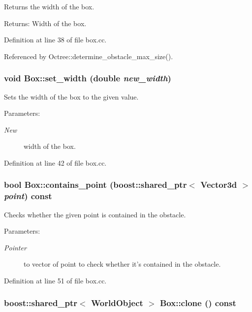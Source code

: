 Returns the width of the box. \begin{Desc}
\item[Returns:]Width of the box. \end{Desc}


Definition at line 38 of file box.cc.

Referenced by Octree::determine\_\-obstacle\_\-max\_\-size().\hypertarget{class_box_c681f5c0251287c23b004e7e13246581}{
\subsubsection[set\_\-width]{\setlength{\rightskip}{0pt plus 5cm}void Box::set\_\-width (double {\em new\_\-width})}}
\label{class_box_c681f5c0251287c23b004e7e13246581}


Sets the width of the box to the given value. \begin{Desc}
\item[Parameters:]
\begin{description}
\item[{\em New}]width of the box. \end{description}
\end{Desc}


Definition at line 42 of file box.cc.\hypertarget{class_box_3ef2a0b5fc2bed2036c5fc6e350335f2}{
\subsubsection[contains\_\-point]{\setlength{\rightskip}{0pt plus 5cm}bool Box::contains\_\-point (boost::shared\_\-ptr$<$ Vector3d $>$ {\em point}) const}}
\label{class_box_3ef2a0b5fc2bed2036c5fc6e350335f2}


Checks whether the given point is contained in the obstacle. \begin{Desc}
\item[Parameters:]
\begin{description}
\item[{\em Pointer}]to vector of point to check whether it's contained in the obstacle. \end{description}
\end{Desc}


Definition at line 51 of file box.cc.\hypertarget{class_box_06c27f9a07a6ba9e87aa0c2e57237b5c}{
\subsubsection[clone]{\setlength{\rightskip}{0pt plus 5cm}boost::shared\_\-ptr$<$ {\bf WorldObject} $>$ Box::clone () const}}
\label{class_box_06c27f9a07a6ba9e87aa0c2e57237b5c}


